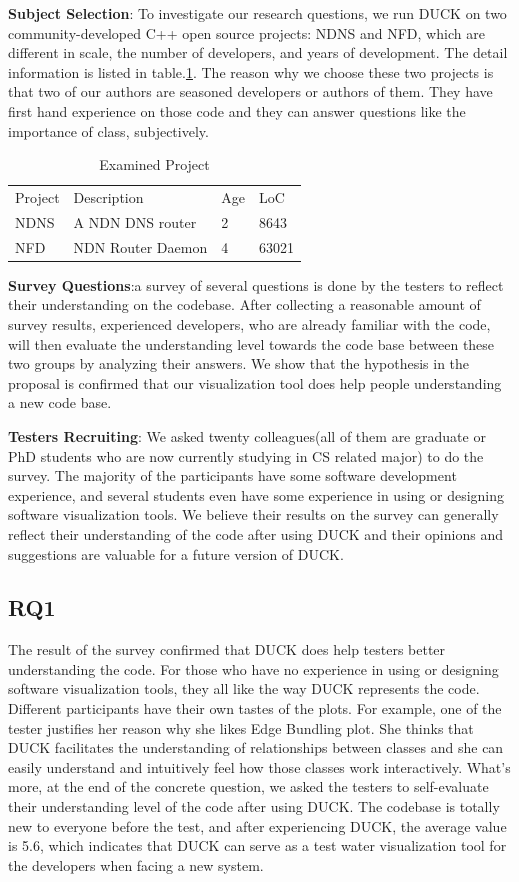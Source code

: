 \documentclass{sig-alternate}
\begin{document}
\textbf{Subject Selection}: To investigate our research questions, we run DUCK on two community-developed C++ open source projects: NDNS and NFD, which are different in scale, the number of developers, and years of development. The detail information is listed in table.\ref{table:examinedProject}. The reason why we choose these two projects is that two of our authors are seasoned developers or authors of them. They have first hand experience on those code and they can answer questions like the importance of class, subjectively.

\begin{table}[]
\centering
\caption{Examined Project}
\label{table:examinedProject}
\begin{tabular}{|l|l|l|l|}
Project & Description & Age & LoC \\
NDNS   & A NDN DNS router & 2 & 8643   \\
NFD & NDN Router Daemon & 4 & 63021                         
\end{tabular}
\end{table}

\textbf{Survey Questions}:a survey of several questions is done by the testers to reflect their understanding on the codebase.  After collecting a reasonable amount of survey results, experienced developers, who are already familiar with the code, will then evaluate the understanding level towards the code base between these two groups by analyzing their answers. We show that the hypothesis in the proposal is confirmed that our visualization tool does help people understanding a new code base.

\textbf{Testers Recruiting}: We asked twenty colleagues(all of them are graduate or PhD students who are now currently studying in CS related major) to do the survey. The majority of the participants have some software development experience, and several students even have some experience in using or designing software visualization tools. We believe their results on the survey can generally reflect their understanding of the code after using DUCK and their opinions and suggestions are valuable for a future version of DUCK.

\subsection{RQ1}
The result of the survey confirmed that DUCK does help testers better understanding the code. For those who have no experience in using or designing software visualization tools, they all like the way DUCK represents the code. Different participants have their own tastes of the plots. For example, one of the tester justifies her reason why she likes Edge Bundling plot. She thinks that DUCK facilitates the understanding of relationships between classes and she can easily understand and intuitively feel how those classes work interactively. What's more, at the end of the concrete question, we asked the testers to self-evaluate their understanding level of the code after using DUCK. The codebase is totally new to everyone before the test, and after experiencing DUCK, the average value is 5.6, which indicates that DUCK can serve as a test water visualization tool for the developers when facing a new system.
\end{document}
